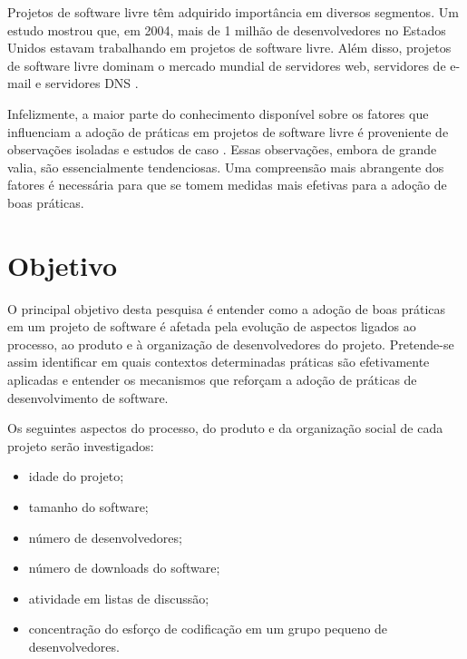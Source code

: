 \documentclass{article}
\begin{document}
Projetos de software livre têm adquirido importância em diversos segmentos. Um
estudo mostrou que, em 2004, mais de 1 milhão de desenvolvedores no Estados
Unidos estavam trabalhando em projetos de software livre. Além disso, projetos
de software livre dominam o mercado mundial de servidores web, servidores de
e-mail e servidores DNS \cite{wheeler2007}.



Infelizmente, a maior parte do conhecimento disponível sobre os fatores que
influenciam a adoção de práticas em projetos de software livre é proveniente de
observações isoladas e estudos de caso \cite{crowston2005}. Essas observações,
embora de grande valia, são essencialmente tendenciosas. Uma compreensão mais
abrangente dos fatores é necessária para que se tomem medidas mais efetivas para
a adoção de boas práticas. 


\section{Objetivo}

O principal objetivo desta pesquisa é entender como a adoção de boas práticas
em um projeto de software é afetada pela evolução de aspectos ligados ao
processo, ao produto e à organização de desenvolvedores do projeto.
Pretende-se assim identificar em quais contextos determinadas práticas são
efetivamente aplicadas e entender os mecanismos que reforçam a adoção de
práticas de desenvolvimento de software.

Os seguintes aspectos do processo, do produto e da organização social de cada
projeto serão investigados:
\begin{itemize}
  \item idade do projeto;
  \item tamanho do software;
  \item número de desenvolvedores;
  \item número de downloads do software;
  \item atividade em listas de discussão;
  \item concentração do esforço de codificação em um grupo pequeno de
desenvolvedores.
\end{itemize}
\end{document}
